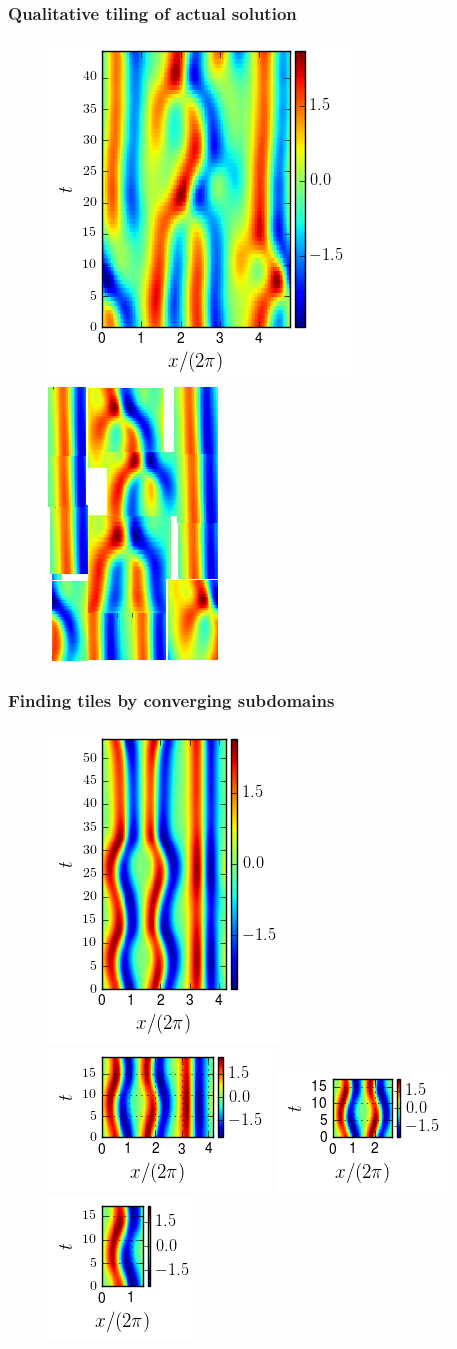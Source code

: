 \documentclass[mathserif, handout]{beamer}
\begin{document}
\begin{frame}%
  \frametitle{Qualitative tiling of actual solution}
  \begin{figure}
    \includegraphics[width=.4\textwidth,height=.4\textheight]{MNG_ppo_L30_T44}
    \includegraphics[width=.28\textwidth,height=.35\textheight]{MNG_ppo_frankenstein}
  \end{figure}
\end{frame}

\begin{frame}%
  \frametitle{Finding tiles by converging subdomains}
  \begin{figure}
  \includegraphics[width=.2\textwidth]{gap0}
  \includegraphics[width=.2\textwidth]{gap1}
  \includegraphics[width=.2\textwidth]{gap2}
  \includegraphics[width=.2\textwidth]{MNG_gap_final}
  \end{figure}
\end{frame}
\end{document}
